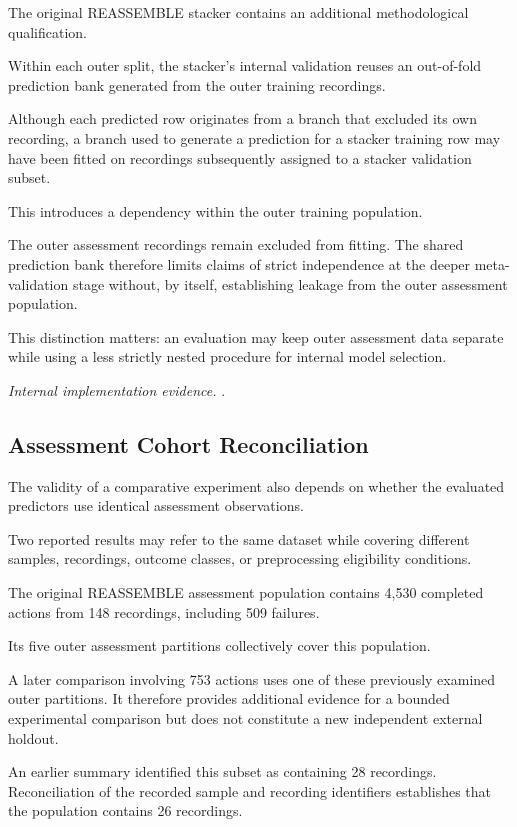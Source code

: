 The original REASSEMBLE stacker contains an additional methodological qualification.

Within each outer split, the stacker's internal validation reuses an out-of-fold prediction bank generated from the outer training recordings.

Although each predicted row originates from a branch that excluded its own recording, a branch used to generate a prediction for a stacker training row may have been fitted on recordings subsequently assigned to a stacker validation subset.

This introduces a dependency within the outer training population.

The outer assessment recordings remain excluded from fitting. The shared prediction bank therefore limits claims of strict independence at the deeper meta-validation stage without, by itself, establishing leakage from the outer assessment population.

This distinction matters: an evaluation may keep outer assessment data separate while using a less strictly nested procedure for internal model selection.

\noindent\textit{Internal implementation evidence.} .

\subsection{Assessment Cohort Reconciliation}

The validity of a comparative experiment also depends on whether the evaluated predictors use identical assessment observations.

Two reported results may refer to the same dataset while covering different samples, recordings, outcome classes, or preprocessing eligibility conditions.

The original REASSEMBLE assessment population contains 4,530 completed actions from 148 recordings, including 509 failures.

Its five outer assessment partitions collectively cover this population.

A later comparison involving 753 actions uses one of these previously examined outer partitions. It therefore provides additional evidence for a bounded experimental comparison but does not constitute a new independent external holdout.

An earlier summary identified this subset as containing 28 recordings. Reconciliation of the recorded sample and recording identifiers establishes that the population contains 26 recordings.

